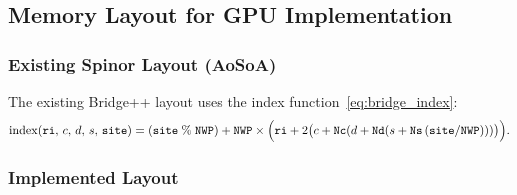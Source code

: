 \documentclass[12pt,a4paper]{article}
\newcommand{\NWP}{\mathtt{NWP}}
\newcommand{\Nc}{\mathtt{Nc}}
\newcommand{\Nd}{\mathtt{Nd}}
\newcommand{\Ns}{\mathtt{Ns}}
\begin{document}
\subsection{Memory Layout for GPU Implementation}
\label{sec:layout}

\subsubsection{Existing Spinor Layout (AoSoA)}

The existing Bridge++ layout uses the index function~\eqref{eq:bridge_index}:
\begin{equation}
  \mathrm{index}(\mathtt{ri},\, c,\, d,\, s,\, \mathtt{site})
  = (\mathtt{site}\;\%\;\NWP)
  + \NWP \times
  \Bigl(\mathtt{ri} + 2\bigl(c + \Nc(d + \Nd(s + \Ns\,(\mathtt{site}/\NWP)))\bigr)\Bigr).
\end{equation}

\subsubsection{Implemented Layout}
\end{document}
